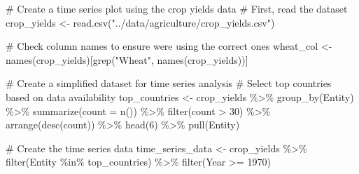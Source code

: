 \documentclass[
  letterpaper,
]{book}
\newenvironment{Shaded}{\begin{snugshade}}{\end{snugshade}}
\newcommand{\AttributeTok}[1]{\textcolor[rgb]{0.40,0.45,0.13}{#1}}
\newcommand{\CommentTok}[1]{\textcolor[rgb]{0.37,0.37,0.37}{#1}}
\newcommand{\DecValTok}[1]{\textcolor[rgb]{0.68,0.00,0.00}{#1}}
\newcommand{\FunctionTok}[1]{\textcolor[rgb]{0.28,0.35,0.67}{#1}}
\newcommand{\NormalTok}[1]{\textcolor[rgb]{0.00,0.23,0.31}{#1}}
\newcommand{\OtherTok}[1]{\textcolor[rgb]{0.00,0.23,0.31}{#1}}
\newcommand{\SpecialCharTok}[1]{\textcolor[rgb]{0.37,0.37,0.37}{#1}}
\newcommand{\StringTok}[1]{\textcolor[rgb]{0.13,0.47,0.30}{#1}}
\begin{document}
\begin{Shaded}
\begin{Highlighting}[]
\CommentTok{\# Create a time series plot using the crop yields data}
\CommentTok{\# First, read the dataset}
\NormalTok{crop\_yields }\OtherTok{\textless{}{-}} \FunctionTok{read.csv}\NormalTok{(}\StringTok{"../data/agriculture/crop\_yields.csv"}\NormalTok{)}

\CommentTok{\# Check column names to ensure we\textquotesingle{}re using the correct ones}
\NormalTok{wheat\_col }\OtherTok{\textless{}{-}} \FunctionTok{names}\NormalTok{(crop\_yields)[}\FunctionTok{grep}\NormalTok{(}\StringTok{"Wheat"}\NormalTok{, }\FunctionTok{names}\NormalTok{(crop\_yields))]}

\CommentTok{\# Create a simplified dataset for time series analysis}
\CommentTok{\# Select top countries based on data availability}
\NormalTok{top\_countries }\OtherTok{\textless{}{-}}\NormalTok{ crop\_yields }\SpecialCharTok{\%\textgreater{}\%}
  \FunctionTok{group\_by}\NormalTok{(Entity) }\SpecialCharTok{\%\textgreater{}\%}
  \FunctionTok{summarize}\NormalTok{(}\AttributeTok{count =} \FunctionTok{n}\NormalTok{()) }\SpecialCharTok{\%\textgreater{}\%}
  \FunctionTok{filter}\NormalTok{(count }\SpecialCharTok{\textgreater{}} \DecValTok{30}\NormalTok{) }\SpecialCharTok{\%\textgreater{}\%}
  \FunctionTok{arrange}\NormalTok{(}\FunctionTok{desc}\NormalTok{(count)) }\SpecialCharTok{\%\textgreater{}\%}
  \FunctionTok{head}\NormalTok{(}\DecValTok{6}\NormalTok{) }\SpecialCharTok{\%\textgreater{}\%}
  \FunctionTok{pull}\NormalTok{(Entity)}

\CommentTok{\# Create the time series data}
\NormalTok{time\_series\_data }\OtherTok{\textless{}{-}}\NormalTok{ crop\_yields }\SpecialCharTok{\%\textgreater{}\%}
  \FunctionTok{filter}\NormalTok{(Entity }\SpecialCharTok{\%in\%}\NormalTok{ top\_countries) }\SpecialCharTok{\%\textgreater{}\%}
  \FunctionTok{filter}\NormalTok{(Year }\SpecialCharTok{\textgreater{}=} \DecValTok{1970}\NormalTok{)}


\end{Highlighting}
\end{Shaded}
\end{document}
